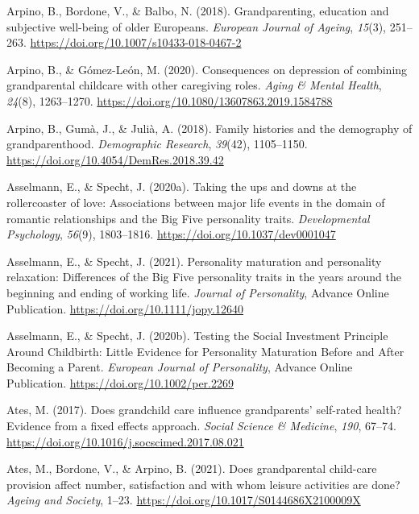 \documentclass[
  english,
  man,floatsintext]{apa7}
\begin{document}
\leavevmode\hypertarget{ref-arpinoGrandparentingEducationSubjective2018}{}%
Arpino, B., Bordone, V., \& Balbo, N. (2018). Grandparenting, education and subjective well-being of older Europeans. \emph{European Journal of Ageing}, \emph{15}(3), 251--263. \url{https://doi.org/10.1007/s10433-018-0467-2}

\leavevmode\hypertarget{ref-arpinoConsequencesDepressionCombining2020}{}%
Arpino, B., \& Gómez-León, M. (2020). Consequences on depression of combining grandparental childcare with other caregiving roles. \emph{Aging \& Mental Health}, \emph{24}(8), 1263--1270. \url{https://doi.org/10.1080/13607863.2019.1584788}

\leavevmode\hypertarget{ref-arpinoFamilyHistoriesDemography2018}{}%
Arpino, B., Gumà, J., \& Julià, A. (2018). Family histories and the demography of grandparenthood. \emph{Demographic Research}, \emph{39}(42), 1105--1150. \url{https://doi.org/10.4054/DemRes.2018.39.42}

\leavevmode\hypertarget{ref-asselmannTakingUpsDowns2020}{}%
Asselmann, E., \& Specht, J. (2020a). Taking the ups and downs at the rollercoaster of love: Associations between major life events in the domain of romantic relationships and the Big Five personality traits. \emph{Developmental Psychology}, \emph{56}(9), 1803--1816. \url{https://doi.org/10.1037/dev0001047}

\leavevmode\hypertarget{ref-asselmannPersonalityMaturationPersonality2021}{}%
Asselmann, E., \& Specht, J. (2021). Personality maturation and personality relaxation: Differences of the Big Five personality traits in the years around the beginning and ending of working life. \emph{Journal of Personality}, Advance Online Publication. \url{https://doi.org/10.1111/jopy.12640}

\leavevmode\hypertarget{ref-asselmannTestingSocialInvestment2020}{}%
Asselmann, E., \& Specht, J. (2020b). Testing the Social Investment Principle Around Childbirth: Little Evidence for Personality Maturation Before and After Becoming a Parent. \emph{European Journal of Personality}, Advance Online Publication. \url{https://doi.org/10.1002/per.2269}

\leavevmode\hypertarget{ref-atesDoesGrandchildCare2017}{}%
Ates, M. (2017). Does grandchild care influence grandparents' self-rated health? Evidence from a fixed effects approach. \emph{Social Science \& Medicine}, \emph{190}, 67--74. \url{https://doi.org/10.1016/j.socscimed.2017.08.021}

\leavevmode\hypertarget{ref-atesDoesGrandparentalChildcare2021}{}%
Ates, M., Bordone, V., \& Arpino, B. (2021). Does grandparental child-care provision affect number, satisfaction and with whom leisure activities are done? \emph{Ageing and Society}, 1--23. \url{https://doi.org/10.1017/S0144686X2100009X}
\end{document}
